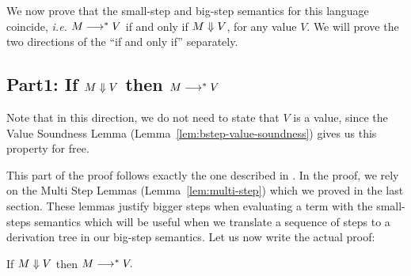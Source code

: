 We now prove that the small-step and big-step semantics for this language
coincide, {\em i.e.} $M \longrightarrow^* V$ if and only if $M \Downarrow V$, for any value
 $V$. We will prove the two directions of the ``if and only if'' separately.

\subsection{Part1: If $M \Downarrow V$ then $M \longrightarrow^* V$}

Note that in this direction, we do not need to state that $V$ is a value, since
the Value Soundness Lemma (Lemma~\ref{lem:bstep-value-soundness}) gives us this
property for free.

This part of the proof follows exactly the one described in \cite{TAPL}. In the
proof, we rely on the Multi Step Lemmas (Lemma~\ref{lem:multi-step}) which we
proved in the last section. These lemmas justify bigger steps when evaluating a
term with the small-steps semantics which will be useful when we translate a
sequence of steps to a derivation tree in our big-step semantics. Let us now
write the actual proof:

\begin{proposition}
  \label{prop:bstep-to-mstep}
  If $M \Downarrow V$ then $M \longrightarrow^* V.$
\end{proposition}

